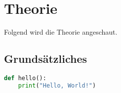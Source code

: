 
\chapter{Theorie}
Folgend wird die Theorie angeschaut.
\section{Grundsätzliches}

\begin{lstlisting}[language=Python, caption=Example Python Code, label={lst:example}]
def hello():
    print("Hello, World!")
\end{lstlisting}